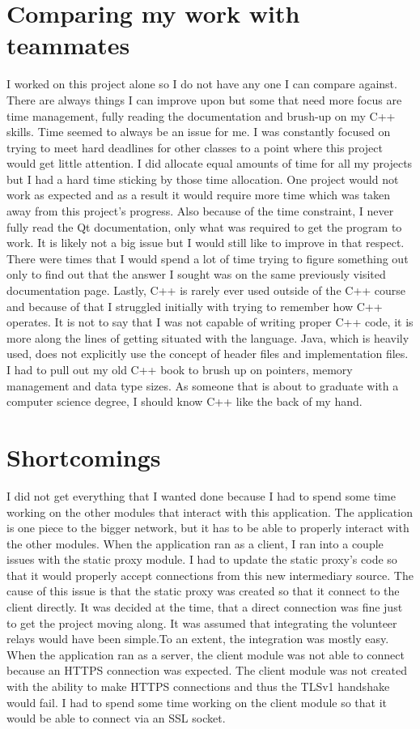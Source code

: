\documentclass[12pt,a4paper]{report}
\begin{document}
	\section{Comparing my work with teammates}
	I worked on this project alone so I do not have any one I can compare against. There are always things I can improve upon but some that need more focus are time management, fully reading the documentation and brush-up on my C++ skills. Time seemed to always be an issue for me. I was constantly focused on trying to meet hard deadlines for other classes to a point where this project would get little attention. I did allocate equal amounts of time for all my projects but I had a hard time sticking by those time allocation. One project would not work as expected and as a result it would require more time which was taken away from this project's progress. Also because of the time constraint, I never fully read the Qt documentation, only what was required to get the program to work. It is likely not a big issue but I would still like to improve in that respect. There were times that I would spend a lot of time trying to figure something out only to find out that the answer I sought was on the same previously visited documentation page. Lastly, C++ is rarely ever used outside of the C++ course and because of that I struggled initially with trying to remember how C++ operates. It is not to say that I was not capable of writing proper C++ code, it is more along the lines of getting situated with the language. Java, which is heavily used, does not explicitly use the concept of header files and implementation files. I had to pull out my old C++ book to brush up on pointers, memory management and data type sizes. As someone that is about to graduate with a computer science degree, I should know C++ like the back of my hand.     
	
	
	\section{Shortcomings}
	I did not get everything that I wanted done because I had to spend some time working on the other modules that interact with this application. The application is one piece to the bigger network, but it has to be able to properly interact with the other modules. When the application ran as a client, I ran into a couple issues with the static proxy module. I had to update the static proxy's code so that it would properly accept connections from this new intermediary source. The cause of this issue is that the static proxy was created so that it connect to the client directly. It was decided at the time, that a direct connection was fine just to get the project moving along. It was assumed that integrating the volunteer relays would have been simple.To an extent, the integration was mostly easy. When the application ran as a server, the client module was not able to connect because an HTTPS connection was expected. The client module was not created with the ability to make HTTPS connections and thus the TLSv1 handshake would fail. I had to spend some time working on the client module so that it would be able to connect via an SSL socket.
	
\end{document}
